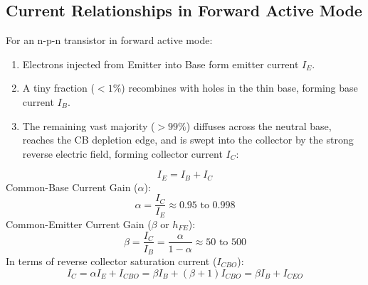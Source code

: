 \documentclass[12pt,a4paper]{article}
\begin{document}
\subsection{Current Relationships in Forward Active Mode}
For an n-p-n transistor in forward active mode:
\begin{enumerate}[label=\arabic*., leftmargin=*]
  \item Electrons injected from Emitter into Base form emitter current $I_E$.
  \item A tiny fraction ($< 1\%$) recombines with holes in the thin base, forming base current $I_B$.
  \item The remaining vast majority ($> 99\%$) diffuses across the neutral base, reaches the CB depletion edge, and is swept into the collector by the strong reverse electric field, forming collector current $I_C$:
\end{enumerate}

\begin{tcolorbox}[formulabox, title={\textbf{BJT Current Relationships}}]
\begin{equation}
  I_E = I_B + I_C
\end{equation}
Common-Base Current Gain ($\alpha$):
\begin{equation}
  \alpha = \frac{I_C}{I_E} \approx 0.95 \text{ to } 0.998
\end{equation}
Common-Emitter Current Gain ($\beta$ or $h_{FE}$):
\begin{equation}
  \beta = \frac{I_C}{I_B} = \frac{\alpha}{1 - \alpha} \approx 50 \text{ to } 500
\end{equation}
In terms of reverse collector saturation current ($I_{CBO}$):
\begin{equation}
  I_C = \alpha I_E + I_{CBO} = \beta I_B + (\beta + 1) I_{CBO} = \beta I_B + I_{CEO}
\end{equation}
\end{tcolorbox}
\end{document}
